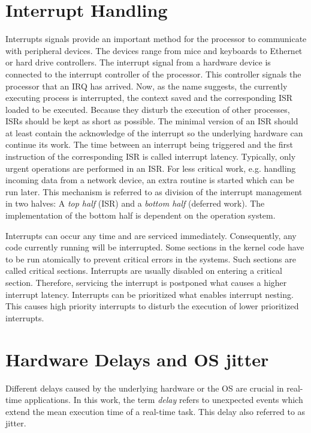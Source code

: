 \section{Interrupt Handling}\label{s_interrupt_handling}
Interrupts signals provide an important method for the processor to communicate with peripheral devices.
The devices range from mice and keyboards to Ethernet or hard drive controllers.
The interrupt signal from a hardware device is connected to the interrupt controller of the processor. 
This controller signals the processor that an \ac{IRQ} has arrived.
Now, as the name suggests, the currently executing process is interrupted, the context saved and the corresponding \ac{ISR} loaded to be executed.
Because they disturb the execution of other processes, \acp{ISR} should be kept as short as possible.
The minimal version of an \ac{ISR} should at least contain the acknowledge of the interrupt so the underlying hardware can continue its work.
The time between an interrupt being triggered and the first instruction of the corresponding \ac{ISR} is called interrupt latency.
Typically, only urgent operations are performed in an \ac{ISR}. 
For less critical work, e.g. handling incoming data from a network device, an extra routine is started which can be run later.
This mechanism is referred to as division of the interrupt management in two halves: A \textit{top half} (\ac{ISR}) and a \textit{bottom half} (deferred work).
The implementation of the bottom half is dependent on the operation system. 
\par
Interrupts can occur any time and are serviced immediately.
Consequently, any code currently running will be interrupted.
Some sections in the kernel code have to be run atomically to prevent critical errors in the systems.
Such sections are called critical sections.
Interrupts are usually disabled on entering a critical section.
Therefore, servicing the interrupt is postponed what causes a higher interrupt latency.
Interrupts can be prioritized what enables interrupt nesting.
This causes high priority interrupts to disturb the execution of lower prioritized interrupts.
 
\section{Hardware Delays and \ac{OS} jitter}\label{s_hardware_delays_and_os_jitter}
Different delays caused by the underlying hardware or the \ac{OS} are crucial in real-time applications.
In this work, the term \textit{delay} refers to unexpected events which extend the mean execution time of a real-time task.
This delay also referred to as jitter.  

